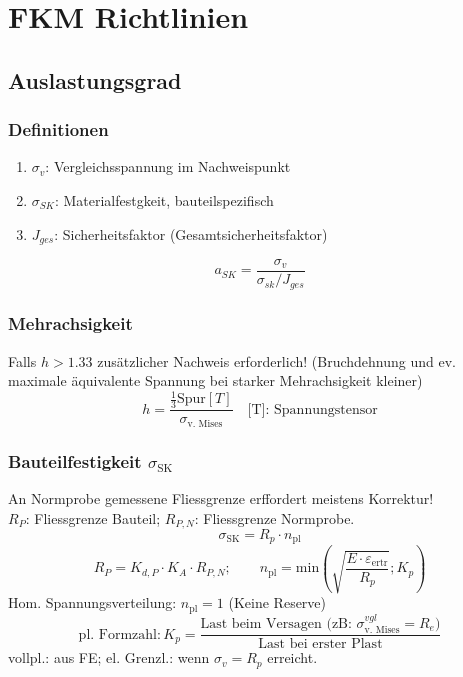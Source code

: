 \vspace{-2mm}
\section{FKM Richtlinien}{}
    \subsection{Auslastungsgrad}

        \subsubsection{Definitionen}
            \begin{enumerate}[noitemsep]
                \item $\sigma_{v}$: Vergleichsspannung im Nachweispunkt
                \item $\sigma_{SK}$: Materialfestgkeit, bauteilspezifisch
                \item $J_{ges}$: Sicherheitsfaktor (Gesamtsicherheitsfaktor)
            \end{enumerate}
            \vspace{-1mm}\[\boxed{a_{SK} = \frac{\sigma_{v}}{\sigma_{sk}/J_{ges}}}\]

        \subsubsection{Mehrachsigkeit}
            Falls $h > 1.33$ zusätzlicher Nachweis erforderlich! (Bruchdehnung und ev. maximale äquivalente Spannung bei starker Mehrachsigkeit kleiner)
            \vspace{-2mm}\[\boxed{h = \frac{\frac{1}{3} \textrm{Spur}[T]}{\sigma_{\textrm{v. Mises}}}} \quad \textrm{[T]: Spannungstensor}\]
        \subsubsection{Bauteilfestigkeit $\sigma_{\textrm{SK}}$}
            An Normprobe gemessene Fliessgrenze erffordert meistens Korrektur! \\$R_P$: Fliessgrenze Bauteil; $R_{P,N}$: Fliessgrenze Normprobe.
            \[\boxed{\sigma_\textrm{SK}=R_p\cdot n_{\textrm{pl}}}\]
            \[R_P = K_{d,P}\cdot K_A\cdot R_{P,N};\qquad n_{\textrm{pl}}=\textrm{min} \left( \sqrt{ \frac{E\cdot\varepsilon_{\textrm{ertr}}}{R_p}};K_p \right)\]
            Hom. Spannungsverteilung: $n_{\textrm{pl}}=1$ (Keine Reserve)
            \vspace{-1mm}
            \[\textrm{pl. Formzahl}: \boxed{K_p  = \frac{\textrm{Last beim Versagen
            (zB: }\sigma_{\textrm{v. Mises}}^{vgl}=R_e\textrm{)}}{\textrm{Last bei erster Plast}}}\]
            vollpl.: aus FE; el. Grenzl.: wenn $\sigma_v = R_p$ erreicht.

